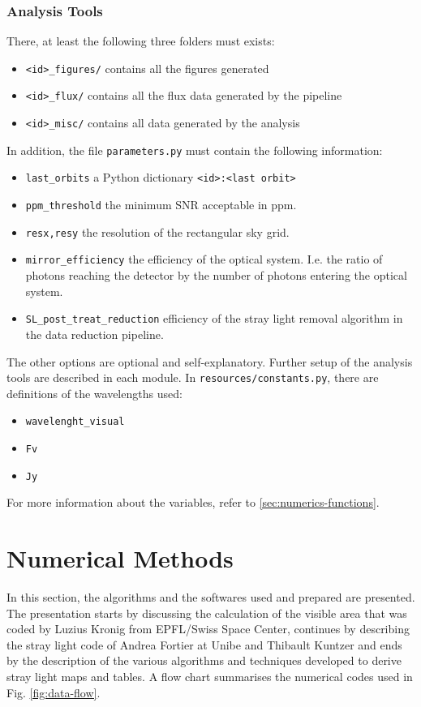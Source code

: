 \documentclass[a4paper,10pt]{article}
\begin{document}
\subsubsection{Analysis Tools}
There, at least the following three folders must exists:
\begin{itemize}
 \item \verb=<id>_figures/= contains all the figures generated
 \item \verb=<id>_flux/= contains all the flux data generated by the pipeline
 \item \verb=<id>_misc/= contains all data generated by the analysis
\end{itemize}
In addition, the file \verb=parameters.py= must contain the following information:
\begin{itemize}
 \item \verb=last_orbits= a Python dictionary \verb=<id>:<last orbit>=
 \item \verb=ppm_threshold= the minimum SNR acceptable in ppm.
 \item \verb=resx,resy= the resolution of the rectangular sky grid.
  \item \verb=mirror_efficiency= the efficiency of the optical system. I.e. the ratio of photons reaching the detector by the number of photons entering the optical system.
 \item \verb=SL_post_treat_reduction= efficiency of the stray light removal algorithm in the data reduction pipeline.
\end{itemize}
The other options are optional and self-explanatory. Further setup of the analysis tools are described in each module. In \verb=resources/constants.py=, there are definitions of the wavelengths used:
\begin{itemize}
 \item \verb=wavelenght_visual=
 \item \verb=Fv=
 \item \verb=Jy=
\end{itemize}
For more information about the variables, refer to \ref{sec:numerics-functions}.


\section{Numerical Methods}\label{sec:Usage:Methods}
In this section, the algorithms and the softwares used and prepared are presented. The presentation starts by discussing the calculation of the visible area that was coded by Luzius Kronig from EPFL/Swiss Space Center, continues by describing the stray light code of Andrea Fortier at Unibe and Thibault Kuntzer and ends by the description of the various algorithms and techniques developed to derive stray light maps and tables. A flow chart summarises the numerical codes used in Fig. \ref{fig:data-flow}.

\end{document}
